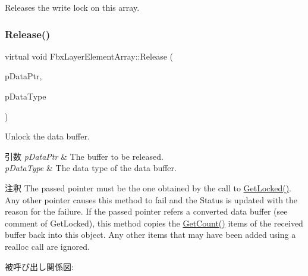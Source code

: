 Releases the write lock on this array. \mbox{\label{class_fbx_layer_element_array_a574fce5860ae84a77c15d18bf3a2cd87}} 
\subsubsection{\texorpdfstring{Release()}{Release()}\hspace{0.1cm}{\footnotesize\ttfamily [1/3]}}
{\footnotesize\ttfamily virtual void Fbx\+Layer\+Element\+Array\+::\+Release (\begin{DoxyParamCaption}\item[{void $\ast$$\ast$}]{p\+Data\+Ptr,  }\item[{\hyperlink{fbxpropertytypes_8h_a73913a5ddfb20e57c6f25e9e6784bd92}{E\+Fbx\+Type}}]{p\+Data\+Type }\end{DoxyParamCaption})\hspace{0.3cm}{\ttfamily [virtual]}}

Unlock the data buffer. 
\begin{DoxyParams}{引数}
{\em p\+Data\+Ptr} & The buffer to be released. \\
\hline
{\em p\+Data\+Type} & The data type of the data buffer. \\
\hline
\end{DoxyParams}
\begin{DoxyRemark}{注釈}
The passed pointer must be the one obtained by the call to \hyperlink{class_fbx_layer_element_array_a34ac50b866b0615109329c114e612b83}{Get\+Locked()}. Any other pointer causes this method to fail and the Status is updated with the reason for the failure. If the passed pointer refers a converted data buffer (see comment of Get\+Locked), this method copies the \hyperlink{class_fbx_layer_element_array_acd195095246f6d886d55fd0aa7129b2d}{Get\+Count()} items of the received buffer back into this object. Any other items that may have been added using a realloc call are ignored. 
\end{DoxyRemark}
被呼び出し関係図\+:
\mbox{\label{class_fbx_layer_element_array_a9706ee3edb65ea08c7b95b5c83224371}} 
